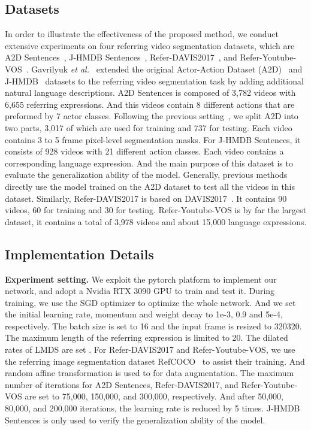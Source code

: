 \documentclass[10pt,twocolumn,letterpaper]{article}
\begin{document}
\subsection{Datasets}
In order to illustrate the effectiveness of the proposed method, we conduct extensive experiments on four referring video segmentation datasets, which are A2D Sentences~\cite{gavrilyuk2018actor}, J-HMDB Sentences~\cite{gavrilyuk2018actor}, Refer-DAVIS2017~\cite{khoreva2018video}, and Refer-Youtube-VOS~\cite{seo2020urvos}.
Gavrilyuk \emph{et al.}~\cite{gavrilyuk2018actor} extended the original Actor-Action Dataset (A2D)~\cite{xu2015can} and J-HMDB~\cite{jhuang2013towards} datasets to the referring video segmentation task by adding additional natural language descriptions.
A2D Sentences is composed of 3,782 videos with 6,655 referring expressions. And this videos contain 8 different actions that are preformed by 7 actor classes. Following the previous setting~\cite{wang2019asymmetric,hui2021collaborative}, we split A2D into two parts, 3,017 of which are used for training and 737 for testing. Each video contains 3 to 5 frame pixel-level segmentation masks. For J-HMDB Sentences, it consists of 928 videos with 21 different action classes. Each video contains a corresponding language expression. And the main purpose of this dataset is to evaluate the generalization ability of the model. Generally, previous methods directly use the model trained on the A2D dataset to test all the videos in this dataset.
Similarly, Refer-DAVIS2017 is based on DAVIS2017~\cite{perazzi2016benchmark}. It contains 90 videos, 60 for training and 30 for testing.
Refer-Youtube-VOS is by far the largest dataset, it contains a total of 3,978 videos and about 15,000 language expressions.
\subsection{Implementation Details}
\noindent\textbf{Experiment setting.}
We exploit the pytorch platform to implement our network, and adopt a Nvidia RTX 3090 GPU to train and test it. During training, we use the SGD optimizer to optimize the whole network. And we set the initial learning rate, momentum and weight decay to 1e-3, 0.9 and 5e-4, respectively. The batch size is set to 16 and the input frame is resized to 320320. The maximum length of the referring expression is limited to 20. The dilated rates of LMDS are set .
For Refer-DAVIS2017 and Refer-Youtube-VOS, we use the referring image segmentation dataset RefCOCO~\cite{yu2016modeling} to assist their training. And random affine transformation is used to for data augmentation. The maximum number of iterations for A2D Sentences, Refer-DAVIS2017, and Refer-Youtube-VOS are set to 75,000, 150,000, and 300,000, respectively. And after 50,000, 80,000, and 200,000 iterations, the learning rate is reduced by 5 times. J-HMDB Sentences is only used to verify the generalization ability of the model.
\end{document}
